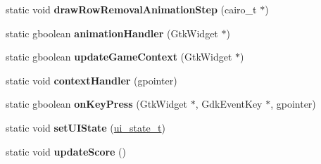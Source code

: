 \begin{DoxyCompactItemize}
\item 
\mbox{\label{classTetreesUI_a5db6dc449dab49c7baa83f35a7909c0c}} 
static void {\bfseries draw\+Row\+Removal\+Animation\+Step} (cairo\+\_\+t $\ast$)
\item 
\mbox{\label{classTetreesUI_a5b96d12dcb64cd2d8b76ec7feeb9e80b}} 
static gboolean {\bfseries animation\+Handler} (Gtk\+Widget $\ast$)
\item 
\mbox{\label{classTetreesUI_a80d2a8dc3841f2285eb22a5238600df7}} 
static gboolean {\bfseries update\+Game\+Context} (Gtk\+Widget $\ast$)
\item 
\mbox{\label{classTetreesUI_aecd0c6b7dad0f9524673711db8364cd6}} 
static void {\bfseries context\+Handler} (gpointer)
\item 
\mbox{\label{classTetreesUI_ad940ec71d761d3234ee3cef397434784}} 
static gboolean {\bfseries on\+Key\+Press} (Gtk\+Widget $\ast$, Gdk\+Event\+Key $\ast$, gpointer)
\item 
\mbox{\label{classTetreesUI_a195806825b5469dcc99fbca5d14af94f}} 
static void {\bfseries set\+U\+I\+State} (\hyperlink{TetreesDefs_8hpp_ab583135648b1264a9f7817709c4dbd3e}{ui\+\_\+state\+\_\+t})
\item 
\mbox{\label{classTetreesUI_ac41bb9dc9af1d051c54dd5f2dcf224a9}} 
static void {\bfseries update\+Score} ()
\end{DoxyCompactItemize}
